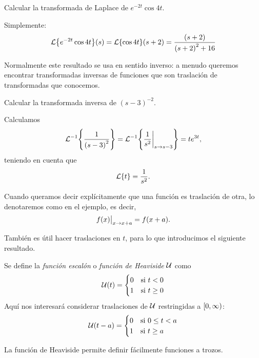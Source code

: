 \documentclass[../ecuaciones_diferenciales.tex]{subfiles}
\begin{document}
\begin{example}
	Calcular la transformada de Laplace de \(e^{-2t} \cos 4t\).
\end{example}

\begin{solution}
	Simplemente:
	\[\laplacetrans{e^{-2t} \cos 4t}(s) = \laplacetrans{\cos 4t}(s+2)
		= \frac{(s+2)}{{(s+2)}^2+16}\]
\end{solution}

Normalmente este resultado se usa en sentido inverso: a menudo queremos
encontrar transformadas inversas de funciones que son traslación de
transformadas que conocemos.

\begin{example}
	Calcular la transformada inversa de \({(s-3)}^{-2}\).
\end{example}

\begin{solution}
	Calculamos
	\[\invlaplacetrans{\frac{1}{{(s-3)}^2}} = \invlaplacetrans{\restr{\frac{1}{s^2}}{s\to s-3}} = t e^{3t},\]
	teniendo en cuenta que
	\[\operatorname{\mathcal{L}}\{t\} = \frac{1}{s^2}.\]
\end{solution}

\begin{notation}
	Cuando queramos decir explícitamente que una función es
	traslación de otra, lo denotaremos como en el ejemplo, es decir,
	\[\restr{f(x)}{x \to x+a} = f(x+a).\]
\end{notation}

También es útil hacer traslaciones en \(t\), para lo que introducimos el
siguiente resultado.

\begin{definition}
	Se define la \emph{función escalón} o \emph{función de Heaviside} \(\mathcal{U}\) como
	\[\mathcal{U}(t) =
		\begin{cases}
			0 & \mathrm{si}\ t < 0    \\
			1 & \mathrm{si}\ t \geq 0
		\end{cases}
	\]
	Aquí nos interesará considerar traslaciones de \(\mathcal{U}\) restringidas a
	\(\closedopen{0}{\infty}\):
	\[\mathcal{U}(t-a) =
		\begin{cases}
			0 & \mathrm{si}\ 0 \leq t < a \\
			1 & \mathrm{si}\ t \geq a
		\end{cases}
	\]
\end{definition}

La función de Heaviside permite definir fácilmente funciones a trozos.
\end{document}
